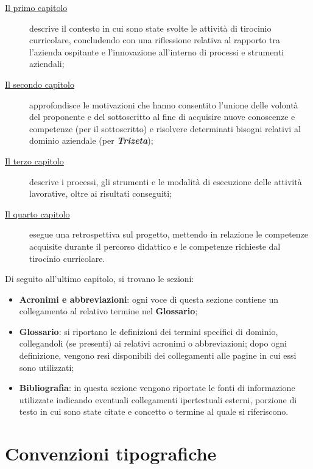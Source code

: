 \begin{description}
    \item[{\hyperref[cap:contesto-svolgimento]{Il primo capitolo}}] descrive il contesto in cui sono state svolte le attività di tirocinio curricolare, concludendo con una riflessione relativa al rapporto tra l'azienda ospitante e l'innovazione all'interno di processi e strumenti aziendali; 
    
    \item[{\hyperref[cap:motivazioni-tirocinio]{Il secondo capitolo}}] approfondisce le motivazioni che hanno consentito l'unione delle volontà del proponente e del sottoscritto al fine di acquisire nuove conoscenze e competenze (per il sottoscritto) e risolvere determinati bisogni relativi al dominio aziendale (per \textbf{\textit{Trizeta}});
    
    \item[{\hyperref[cap:elementi-progetto]{Il terzo capitolo}}] descrive i processi, gli strumenti e le modalità di esecuzione delle attività lavorative, oltre ai risultati conseguiti;
    
    \item[{\hyperref[cap:resoconto]{Il quarto capitolo}}] esegue una retrospettiva sul progetto, mettendo in relazione le competenze acquisite durante il percorso didattico e le competenze richieste dal tirocinio curricolare.
\end{description}

Di seguito all'ultimo capitolo, si trovano le sezioni:
\begin{itemize}
    \item \textbf{Acronimi e abbreviazioni}: ogni voce di questa sezione contiene un collegamento al relativo termine nel \textbf{Glossario};
    \item \textbf{Glossario}: si riportano le definizioni dei termini specifici di dominio, collegandoli (se presenti) ai relativi acronimi o abbreviazioni; dopo ogni definizione, vengono resi disponibili dei collegamenti alle pagine in cui essi sono utilizzati;
    \item \textbf{Bibliografia}: in questa sezione vengono riportate le fonti di informazione utilizzate indicando eventuali collegamenti ipertestuali esterni, porzione di testo in cui sono state citate e concetto o termine al quale si riferiscono.
\end{itemize}

\section*{Convenzioni tipografiche}

